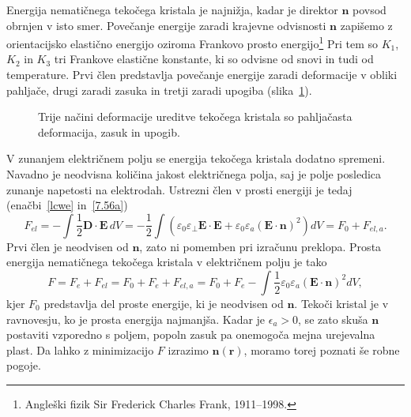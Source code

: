 Energija nematičnega tekočega kristala je najnižja, kadar je direktor $\mathbf{n}$
povsod obrnjen v isto smer. Povečanje energije zaradi krajevne odvisnosti $\mathbf{n}$
zapišemo z orientacijsko elastično energijo oziroma Frankovo prosto 
energijo\footnote{Angleški fizik Sir Frederick Charles Frank, 1911--1998.}
Pri tem so $K_{1}$, $K_{2}$ in $K_{3}$ tri Frankove elastične
konstante, ki so odvisne od snovi in tudi od temperature. 
Prvi člen predstavlja povečanje energije zaradi deformacije v obliki 
pahljače, drugi zaradi zasuka in tretji zaradi upogiba (slika~\ref{s7.20}).
\begin{figure}[h]
\centering
\def\svgwidth{140truemm} 

\caption{Trije načini deformacije ureditve tekočega kristala so pahljačasta deformacija,
zasuk in upogib.}
\label{s7.20}
\end{figure}

V zunanjem električnem polju se energija tekočega kristala dodatno spremeni. 
Navadno je neodvisna količina jakost električnega polja, saj je polje posledica
zunanje napetosti na elektrodah. Ustrezni člen v prosti energiji je tedaj 
(enačbi~\ref{lcwe} in~\ref{7.56a})
\begin{equation}
F_{el} = -\int \frac{1}{2} \mathbf{D}\cdot\mathbf{E}\, dV= -\frac{1}{2} \int
\left( \varepsilon_0 \varepsilon_\bot \mathbf{E}\cdot\mathbf{E} + 
\varepsilon_{0}\varepsilon_{a}(\mathbf{E}\cdot\mathbf{n})^{2}\right)dV = F_0 + F_{el,a}.
\end{equation}
Prvi člen je neodvisen od $\mathbf{n}$, zato ni pomemben pri izračunu
preklopa. Prosta energija
nematičnega tekočega kristala v električnem polju je tako 
\begin{equation}
F=F_e + F_{el} = F_0 + F_e + F_{el,a} = F_{0}+F_{e}-\int \frac{1}{2}\varepsilon_{0}\varepsilon_{a}
(\mathbf{E}\cdot \mathbf{n})^{2}dV,
\label{7.72}
\end{equation}
 kjer $F_{0}$ predstavlja del proste energije, ki je neodvisen od $\mathbf{n}$.
Tekoči kristal je v ravnovesju, ko je prosta energija najmanjša. Kadar je
$\epsilon_{a}>0$, se zato skuša $\mathbf{n}$ postaviti vzporedno s
poljem, popoln zasuk pa onemogoča mejna urejevalna plast. 
Da lahko z minimizacijo $F$ izrazimo $\mathbf{n}(\mathbf{r})$, moramo
torej poznati še robne pogoje.

